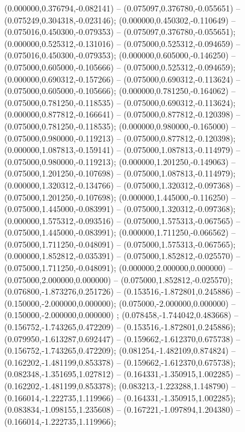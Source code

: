  (0.000000,0.376794,-0.082141) -- (0.075097,0.376780,-0.055651) -- (0.075249,0.304318,-0.023146);
 (0.000000,0.450302,-0.110649) -- (0.075016,0.450300,-0.079353) -- (0.075097,0.376780,-0.055651);
 (0.000000,0.525312,-0.131016) -- (0.075000,0.525312,-0.094659) -- (0.075016,0.450300,-0.079353);
 (0.000000,0.605000,-0.146250) -- (0.075000,0.605000,-0.105666) -- (0.075000,0.525312,-0.094659);
 (0.000000,0.690312,-0.157266) -- (0.075000,0.690312,-0.113624) -- (0.075000,0.605000,-0.105666);
 (0.000000,0.781250,-0.164062) -- (0.075000,0.781250,-0.118535) -- (0.075000,0.690312,-0.113624);
 (0.000000,0.877812,-0.166641) -- (0.075000,0.877812,-0.120398) -- (0.075000,0.781250,-0.118535);
 (0.000000,0.980000,-0.165000) -- (0.075000,0.980000,-0.119213) -- (0.075000,0.877812,-0.120398);
 (0.000000,1.087813,-0.159141) -- (0.075000,1.087813,-0.114979) -- (0.075000,0.980000,-0.119213);
 (0.000000,1.201250,-0.149063) -- (0.075000,1.201250,-0.107698) -- (0.075000,1.087813,-0.114979);
 (0.000000,1.320312,-0.134766) -- (0.075000,1.320312,-0.097368) -- (0.075000,1.201250,-0.107698);
 (0.000000,1.445000,-0.116250) -- (0.075000,1.445000,-0.083991) -- (0.075000,1.320312,-0.097368);
 (0.000000,1.575312,-0.093516) -- (0.075000,1.575313,-0.067565) -- (0.075000,1.445000,-0.083991);
 (0.000000,1.711250,-0.066562) -- (0.075000,1.711250,-0.048091) -- (0.075000,1.575313,-0.067565);
 (0.000000,1.852812,-0.035391) -- (0.075000,1.852812,-0.025570) -- (0.075000,1.711250,-0.048091);
 (0.000000,2.000000,0.000000) -- (0.075000,2.000000,0.000000) -- (0.075000,1.852812,-0.025570);
 (0.076800,-1.873276,0.251726) -- (0.153516,-1.872801,0.245886) -- (0.150000,-2.000000,0.000000);
 (0.075000,-2.000000,0.000000) -- (0.150000,-2.000000,0.000000) ;
 (0.078458,-1.744042,0.483668) -- (0.156752,-1.743265,0.472209) -- (0.153516,-1.872801,0.245886);
 (0.079950,-1.613287,0.692447) -- (0.159662,-1.612370,0.675738) -- (0.156752,-1.743265,0.472209);
 (0.081254,-1.482109,0.874824) -- (0.162202,-1.481199,0.853378) -- (0.159662,-1.612370,0.675738);
 (0.082348,-1.351695,1.027812) -- (0.164331,-1.350915,1.002285) -- (0.162202,-1.481199,0.853378);
 (0.083213,-1.223288,1.148790) -- (0.166014,-1.222735,1.119966) -- (0.164331,-1.350915,1.002285);
 (0.083834,-1.098155,1.235608) -- (0.167221,-1.097894,1.204380) -- (0.166014,-1.222735,1.119966);
